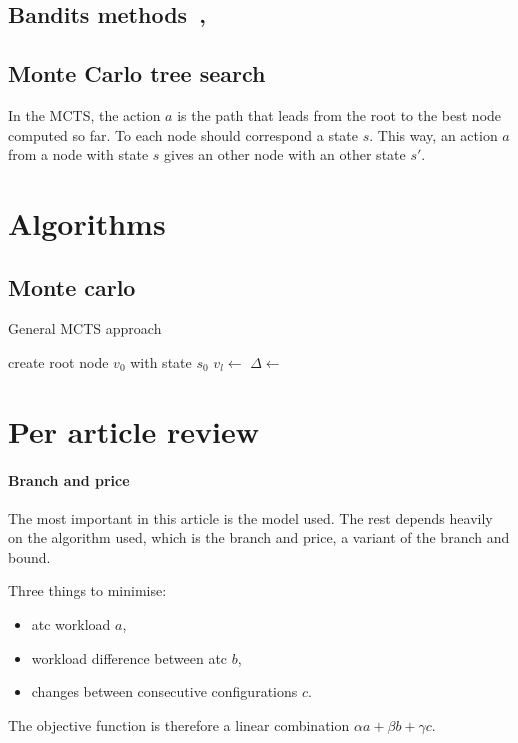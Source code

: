 \documentclass{article}
\begin{document}
\subsection{Bandits methods~\cite{browne2012survey},~\cite{kocsis2006bandit}}

\subsection{Monte Carlo tree search}
In the MCTS, the action \(a\) is the path that leads from the root to the best
node computed so far. To each node should correspond a state \(s\). This way, an
action \(a\) from a node with state \(s\) gives an other node with an other
state \(s'\).

\section{Algorithms}
\subsection{Monte carlo}
\begin{algorithm}
  \caption{General MCTS approach~\cite{browne2012survey}}
  \begin{algorithmic}
    \State{}create root node \(v_0\) with state \(s_0\)
    \State{} \(v_l \gets\) 
    \State{} \(\Delta \gets\) 
    \State{} 
    \EndWhile{}
    \EndFunction{}
  \end{algorithmic}
\end{algorithm}

\section{Per article review}
\paragraph{Branch and price~\cite{treimuth2016branch}}
The most important in this article is the model used. The rest depends heavily
on the algorithm used, which is the branch and price, a variant of the branch
and bound.

Three things to minimise:
\begin{itemize}
  \item atc workload \(a\),
  \item workload difference between atc \(b\),
  \item changes between consecutive configurations \(c\).
\end{itemize}
The objective function is therefore a linear combination \(\alpha a + \beta b +
\gamma c\).
\end{document}
